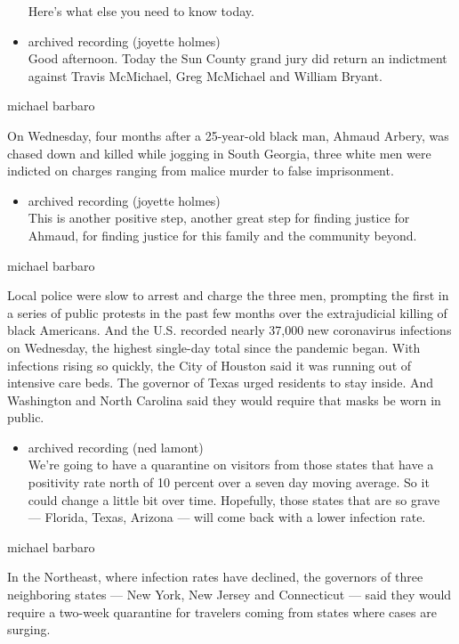 \begin{itemize}
  Here's what else you need to know today.
\item
  archived recording (joyette holmes)\\
  Good afternoon. Today the Sun County grand jury did return an
  indictment against Travis McMichael, Greg McMichael and William
  Bryant.
\end{itemize}

michael barbaro

On Wednesday, four months after a 25-year-old black man, Ahmaud Arbery,
was chased down and killed while jogging in South Georgia, three white
men were indicted on charges ranging from malice murder to false
imprisonment.

\begin{itemize}
\tightlist
\item
  archived recording (joyette holmes)\\
  This is another positive step, another great step for finding justice
  for Ahmaud, for finding justice for this family and the community
  beyond.
\end{itemize}

michael barbaro

Local police were slow to arrest and charge the three men, prompting the
first in a series of public protests in the past few months over the
extrajudicial killing of black Americans. And the U.S. recorded nearly
37,000 new coronavirus infections on Wednesday, the highest single-day
total since the pandemic began. With infections rising so quickly, the
City of Houston said it was running out of intensive care beds. The
governor of Texas urged residents to stay inside. And Washington and
North Carolina said they would require that masks be worn in public.

\begin{itemize}
\tightlist
\item
  archived recording (ned lamont)\\
  We're going to have a quarantine on visitors from those states that
  have a positivity rate north of 10 percent over a seven day moving
  average. So it could change a little bit over time. Hopefully, those
  states that are so grave --- Florida, Texas, Arizona --- will come
  back with a lower infection rate.
\end{itemize}

michael barbaro

In the Northeast, where infection rates have declined, the governors of
three neighboring states --- New York, New Jersey and Connecticut ---
said they would require a two-week quarantine for travelers coming from
states where cases are surging.

